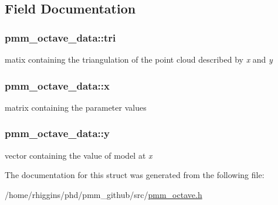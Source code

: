 \subsection{Field Documentation}
\hypertarget{structpmm__octave__data_adaeccdb402cc77226d20750d43953db8}{
\subsubsection[{tri}]{ pmm\-\_\-octave\-\_\-data\-::tri}}\label{structpmm__octave__data_adaeccdb402cc77226d20750d43953db8}
matix containing the triangulation of the point cloud described by {\itshape x} and {\itshape y} \hypertarget{structpmm__octave__data_ace2f8907e7666e70d025dbe0b3482ff3}{
\subsubsection[{x}]{ pmm\-\_\-octave\-\_\-data\-::x}}\label{structpmm__octave__data_ace2f8907e7666e70d025dbe0b3482ff3}
matrix containing the parameter values \hypertarget{structpmm__octave__data_aeba4f191e9bb831df791d1ce91bf60ac}{
\subsubsection[{y}]{ pmm\-\_\-octave\-\_\-data\-::y}}\label{structpmm__octave__data_aeba4f191e9bb831df791d1ce91bf60ac}
vector containing the value of model at {\itshape x} 

The documentation for this struct was generated from the following file\-:\begin{DoxyCompactItemize}
\item 
/home/rhiggins/phd/pmm\-\_\-github/src/\hyperlink{pmm__octave_8h}{pmm\-\_\-octave.\-h}\end{DoxyCompactItemize}
